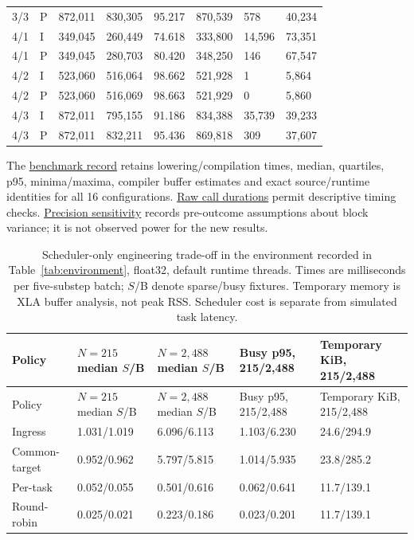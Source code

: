 \documentclass[12pt,a4paper]{article}
\begin{document}
\begin{xltabular}{\textwidth}{@{}YYYYYYYY@{}}
3/3 & P & 872,011 & 830,305 & 95.217 & 870,539 & 578 & 40,234 \\
4/1 & I & 349,045 & 260,449 & 74.618 & 333,800 & 14,596 & 73,351 \\
4/1 & P & 349,045 & 280,703 & 80.420 & 348,250 & 146 & 67,547 \\
4/2 & I & 523,060 & 516,064 & 98.662 & 521,928 & 1 & 5,864 \\
4/2 & P & 523,060 & 516,069 & 98.663 & 521,929 & 0 & 5,860 \\
4/3 & I & 872,011 & 795,155 & 91.186 & 834,388 & 35,739 & 39,233 \\
4/3 & P & 872,011 & 832,211 & 95.436 & 869,818 & 309 & 37,607 \\
\end{xltabular}
\endgroup

The \href{\detokenize{../empirical_extension_2026-09-08/analysis/results/BENCHMARK.json}}{benchmark record} retains lowering/compilation times, median, quartiles, p95, minima/maxima, compiler buffer estimates and exact source/runtime identities for all 16 configurations. \href{\detokenize{../empirical_extension_2026-09-08/analysis/results/BENCHMARK_TIMES.csv}}{Raw call durations} permit descriptive timing checks. \href{\detokenize{../empirical_extension_2026-09-08/confirmation/PRECISION.json}}{Precision sensitivity} records pre-outcome assumptions about block variance; it is not observed power for the new results.

\begingroup
\singlespacing\footnotesize\setlength{\tabcolsep}{3pt}
\begin{xltabular}{\textwidth}{@{}YYYYY@{}}
\caption[Scheduler-only engineering trade-offs]{Scheduler-only engineering trade-off in the environment recorded in Table~\ref{tab:environment}, float32, default runtime threads. Times are milliseconds per five-substep batch; $S$/B denote sparse/busy fixtures. Temporary memory is XLA buffer analysis, not peak RSS. Scheduler cost is separate from simulated task latency.}\label{tab:D2} \\
\toprule
Policy & $N=215$ median $S$/B & $N=2{,}488$ median $S$/B & Busy p95, 215/2,488 & Temporary KiB, 215/2,488 \\
\midrule\endfirsthead
\toprule
Policy & $N=215$ median $S$/B & $N=2{,}488$ median $S$/B & Busy p95, 215/2,488 & Temporary KiB, 215/2,488 \\
\midrule\endhead
\bottomrule\endfoot
Ingress & 1.031/1.019 & 6.096/6.113 & 1.103/6.230 & 24.6/294.9 \\
Common-target & 0.952/0.962 & 5.797/5.815 & 1.014/5.935 & 23.8/285.2 \\
Per-task & 0.052/0.055 & 0.501/0.616 & 0.062/0.641 & 11.7/139.1 \\
Round-robin & 0.025/0.021 & 0.223/0.186 & 0.023/0.201 & 11.7/139.1 \\
\end{xltabular}
\endgroup
\end{document}

